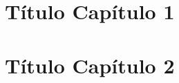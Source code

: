 \documentclass[a4paper,11pt]{book}
\theoremstyle{break}
\begin{document}
\parskip 15pt

\onehalfspacing





\thispagestyle{empty}



\newpage


\pagestyle{fancy}
\tableofcontents


\newpage
\pagestyle{fancy}

\chapter{Título Capítulo 1}
\label{chapter:01}


\chapter{Título Capítulo 2}
\label{chapter:02}






\end{document}
